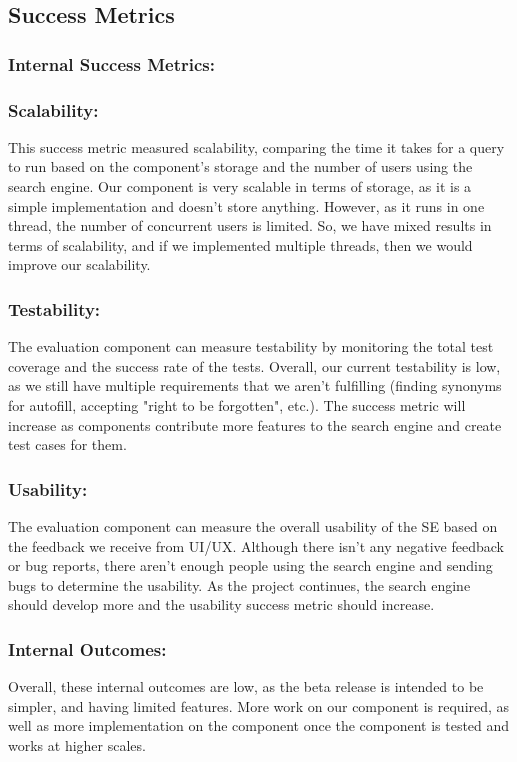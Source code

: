 \pagebreak
\subsection*{Success Metrics}

\subsubsection*{Internal Success Metrics:}

\subsubsection*{Scalability:}
This success metric measured scalability, comparing the time it takes for a query 
to run based on the component's storage and the number of users using the search 
engine. Our component is very scalable in terms of storage, as it is a simple 
implementation and doesn't store anything. However, as it runs in one thread, the
number of concurrent users is limited. So, we have mixed results in terms of scalability, and if we 
implemented multiple threads, then we would improve our scalability.

\subsubsection*{Testability:}
The evaluation component can measure testability by monitoring the total test 
coverage and the success rate of the tests. Overall, our current testability is 
low, as we still have multiple requirements that we aren't fulfilling 
(finding synonyms for autofill, accepting "right to 
be forgotten", etc.). The success metric will increase as components contribute more 
features to the search engine and create test cases for them.

\subsubsection*{Usability:}
The evaluation component can measure the overall usability of the SE based on the 
feedback we receive from UI/UX. Although there isn't any negative feedback or bug 
reports, there aren't enough people using the search engine and sending bugs to 
determine the usability. As the project continues, the search engine should 
develop more and the usability success metric should increase. 

\subsubsection*{Internal Outcomes:}
Overall, these internal outcomes are low, as the beta release is intended to be
simpler, and having limited features. More work on our component is required, 
as well as more implementation on the component once the component is tested
and works at higher scales.


